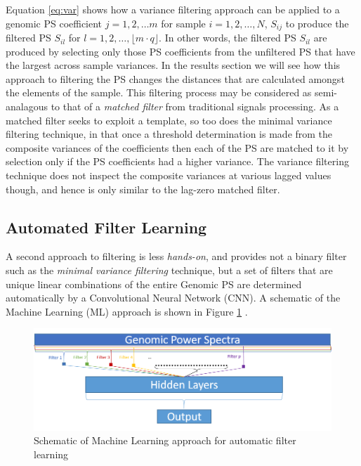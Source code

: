 \documentclass[12pt,conference]{IEEEtran}
\begin{document}
\vspace{-0.5 em} 
Equation \ref{eq:var} shows how a variance filtering approach can be applied to 
a genomic PS coefficient $j = 1,2,\dots m$ for sample $i = 1,2,\dots,N$, $S_{ij}$ to produce  the filtered PS $S_{il}$ for $l = 1,2,\dots,\lfloor m \cdot q \rfloor$. 
In other words, the filtered PS $S_{il}$ are produced by selecting only those PS coefficients from the unfiltered PS that have the largest across sample variances. 
In the results section we will see how this approach to filtering the PS changes the 
distances that are calculated amongst the elements of the sample.  This filtering process may be considered as semi-analagous to that of a \textit{matched filter} from 
traditional signals processing.  
As a matched filter seeks to exploit a template, so too does the minimal variance filtering technique, in that once 
a threshold determination is made from the composite variances of the coefficients then each of the PS are
matched to it  by selection only if the PS coefficients had a higher variance.  
The variance filtering technique does not  inspect the composite variances at various lagged values though, and hence is only similar to the lag-zero matched filter. 

\subsection{Automated Filter Learning} 

A second approach to filtering is less \textit{hands-on}, and provides not a binary filter such as the \textit{minimal variance filtering} technique,  but a set of filters 
that are unique linear combinations of the entire Genomic PS are determined 
automatically by a Convolutional Neural Network (CNN).  A schematic of the 
Machine Learning (ML) approach is shown in Figure \ref{fig:mlschem} .

\begin{figure}[h!]
\centering
\caption{Schematic of Machine Learning approach for automatic filter learning \label{fig:mlschem} }
\includegraphics[scale=0.5]{Images/Files/afl.png}
\end{figure}
\end{document}
